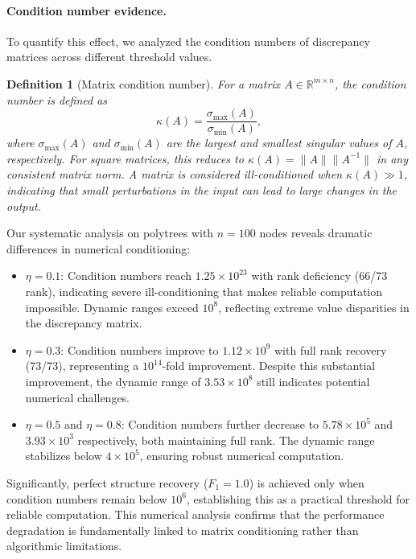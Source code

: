 \documentclass[11pt,a4paper]{article}
\numberwithin{equation}{section}
\newtheorem{definition}[theorem]{Definition}
\begin{document}
\paragraph{Condition number evidence.} To quantify this effect, we analyzed the condition numbers of discrepancy matrices across different threshold values. 

\begin{definition}[Matrix condition number]
For a matrix $A \in \mathbb{R}^{m \times n}$, the condition number is defined as
\begin{equation}
\kappa(A) = \frac{\sigma_{\max}(A)}{\sigma_{\min}(A)},
\end{equation}
where $\sigma_{\max}(A)$ and $\sigma_{\min}(A)$ are the largest and smallest singular values of $A$, respectively. For square matrices, this reduces to $\kappa(A) = \|A\| \|A^{-1}\|$ in any consistent matrix norm. A matrix is considered ill-conditioned when $\kappa(A) \gg 1$, indicating that small perturbations in the input can lead to large changes in the output.
\end{definition}

Our systematic analysis on polytrees with $n = 100$ nodes reveals dramatic differences in numerical conditioning:

\begin{itemize}
\item $\eta = 0.1$: Condition numbers reach $1.25 \times 10^{23}$ with rank deficiency (66/73 rank), indicating severe ill-conditioning that makes reliable computation impossible. Dynamic ranges exceed $10^8$, reflecting extreme value disparities in the discrepancy matrix.

\item $\eta = 0.3$: Condition numbers improve to $1.12 \times 10^9$ with full rank recovery (73/73), representing a $10^{14}$-fold improvement. Despite this substantial improvement, the dynamic range of $3.53 \times 10^8$ still indicates potential numerical challenges.

\item $\eta = 0.5$ and $\eta = 0.8$: Condition numbers further decrease to $5.78 \times 10^5$ and $3.93 \times 10^3$ respectively, both maintaining full rank. The dynamic range stabilizes below $4 \times 10^5$, ensuring robust numerical computation.
\end{itemize}

Significantly, perfect structure recovery ($F_1 = 1.0$) is achieved only when condition numbers remain below $10^6$, establishing this as a practical threshold for reliable computation. This numerical analysis confirms that the performance degradation is fundamentally linked to matrix conditioning rather than algorithmic limitations.
\end{document}
